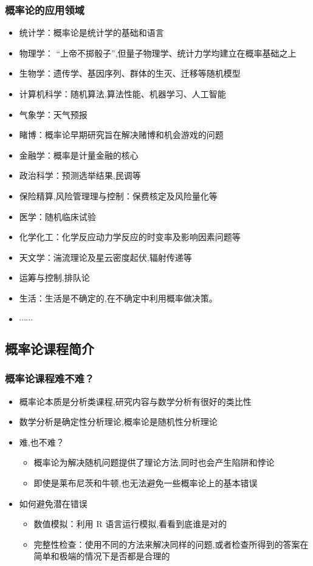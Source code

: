 \begin{frame}
	\frametitle{概率论的应用领域}
	\begin{itemize}[<+-|alert@+>]
		\item 统计学：概率论是统计学的基础和语言
		\item 物理学： ``上帝不掷骰子”,但量子物理学、统计力学均建立在概率基础之上
		\item 生物学：遗传学、基因序列、群体的生灭、迁移等随机模型
		\item  计算机科学：随机算法,算法性能、机器学习、人工智能
		\item 气象学：天气预报
		\item 睹博：概率论早期研究旨在解决赌博和机会游戏的问题
		\item 金融学：概率是计量金融的核心
		\item 政治科学：预测选举结果,民调等
		\item 保险精算,风险管理理与控制：保费核定及风险量化等
   		\item 医学：随机临床试验
		\item 化学化工：化学反应动力学反应的时变率及影响因素问题等
		\item 天文学：湍流理论及星云密度起伏,辐射传递等
		\item 运筹与控制,排队论
		\item 生活：生活是不确定的,在不确定中利用概率做决策。
		\item $\cdots\cdots$
	\end{itemize}
\end{frame}
\subsection{概率论课程简介}
\begin{frame}
	\frametitle{概率论课程难不难？}
	\begin{itemize}[<+-|alert@+>]
		\item  概率论本质是分析类课程,研究内容与数学分析有很好的类比性
		\item 数学分析是确定性分析理论,概率论是随机性分析理论
		\item 难,也不难？
		\begin{itemize}[<+-|alert@+>]
			\item  概率论为解决随机问题提供了理论方法,同时也会产生陷阱和悖论
			\item 即使是莱布尼茨和牛顿,也无法避免一些概率论上的基本错误
		\end{itemize}
	\item 如何避免潜在错误
		\begin{itemize}[<+-|alert@+>]
		\item  数值模拟：利用 R 语言运行模拟,看看到底谁是对的
		\item  完整性检查：使用不同的方法来解决同样的问题,或者检查所得到的答案在简单和极端的情况下是否都是合理的
	\end{itemize}
	\end{itemize}
\end{frame}


